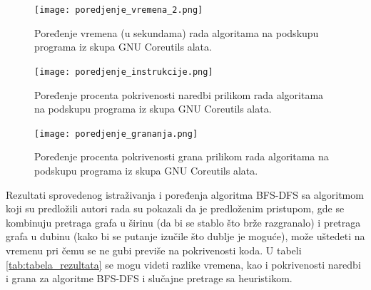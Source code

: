\documentclass[12pt,oneside]{memoir}
\begin{document}
\begin{figure}[H]
    \centering
    \texttt{[image: poredjenje\_vremena\_2.png]}
    \caption{Poređenje vremena (u sekundama) rada algoritama na podskupu programa iz skupa GNU Coreutils alata.}
    \label{fig:poredjenje_vemena_2}
\end{figure}

\begin{figure}[H]
    \centering
    \texttt{[image: poredjenje\_instrukcije.png]}
    \caption{Poređenje procenta pokrivenosti naredbi prilikom rada algoritama na podskupu programa iz skupa GNU Coreutils alata.}
    \label{fig:poredjenje_instrukcija}
\end{figure}

\begin{figure}[H]
    \centering
    \texttt{[image: poredjenje\_grananja.png]}
    \caption{Poređenje procenta pokrivenosti grana prilikom rada algoritama na podskupu programa iz skupa GNU Coreutils alata.}
    \label{fig:poredjenje_grana}
\end{figure}

\newpage
Rezultati sprovedenog istraživanja i poređenja algoritma BFS-DFS sa algoritmom koji su predložili autori rada\cite{klee} su pokazali da je predloženim pristupom, gde se kombinuju pretraga grafa u širinu (da bi se stablo što brže razgranalo) i pretraga grafa u dubinu (kako bi se putanje izučile što dublje je moguće), može uštedeti na vremenu pri čemu se ne gubi previše na pokrivenosti koda. U tabeli \ref{tab:tabela_rezultata} se mogu videti razlike vremena, kao i pokrivenosti naredbi i grana za algoritme BFS-DFS i slučajne pretrage sa heuristikom.
\end{document}
